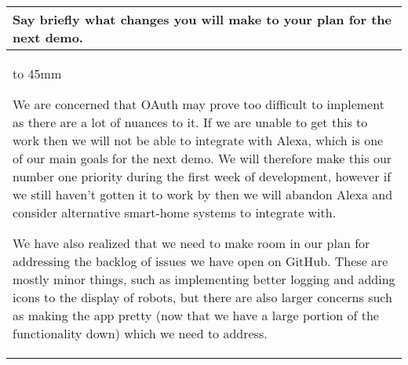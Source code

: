 \documentclass[a4paper]{article}
\newcommand{\colWidth}{141mm}
\begin{document}
\begin{center}

\begin{tabular}{|p{\colWidth}|}
	\hline
	\cellcolor{blue!25}\large
	\textbf{Say briefly what changes you will make to your plan for the next demo.}
	\\ \hline
	\vtop to 45mm{
		We are concerned that OAuth may prove too difficult to implement as there are a lot of nuances to it.
		If we are unable to get this to work then we will not be able to integrate with Alexa, which is one of
		our main goals for the next demo. We will therefore make this our number one priority during the first
		week of development, however if we still haven't gotten it to work by then we will abandon Alexa and
		consider alternative smart-home systems to integrate with.

		\vspace{2mm}

		We have also realized that we need to make room in our plan for addressing the backlog of issues we have
		open on GitHub. These are mostly minor things, such as implementing better logging and adding icons to the display of robots,
		but there are also larger concerns such as making the app pretty (now that we have a large portion of the functionality down)
		which we need to address.
  	}
  \\
  \hline
\end{tabular}

\end{center}
  
\end{document}
